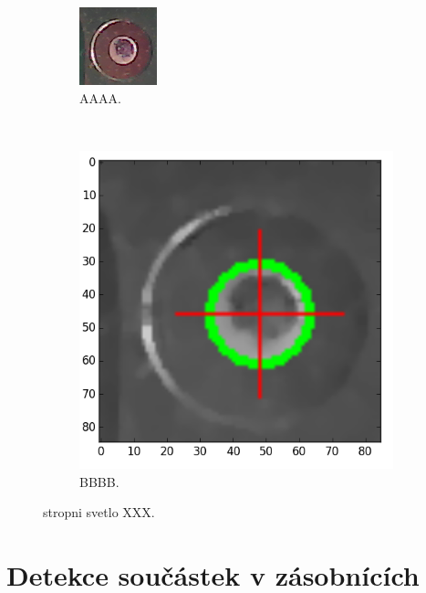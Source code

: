 \begin{figure}[h!]
	\centering
	\begin{subfigure}[b]{0.4\textwidth}
		\centering
		\includegraphics[width=0.4\linewidth, trim = 0cm -1.5cm 0cm 0cm]{obrazky/fiduc_svetlostrop_crop.png}%
		\caption{AAAA.}
		\label{fig:strop}
	\end{subfigure}
	~
	\begin{subfigure}[b]{0.4\textwidth}
		\centering
		\includegraphics[width=0.9\linewidth]{obrazky/fiduc_svetlostrop_crop3.png}%
		\caption{BBBB.}
		\label{fig:strop2}
	\end{subfigure}

	\caption{stropni svetlo XXX.}
\end{figure}





\section{Detekce součástek v zásobnících}

